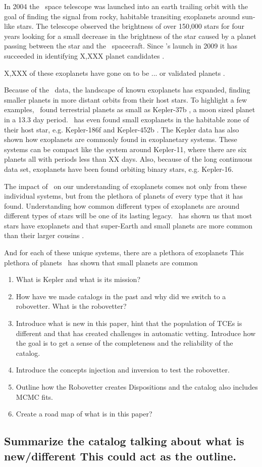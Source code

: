 In 2004 the \Kepler\ space telescope was launched into an earth trailing orbit with the goal of finding the signal from rocky, habitable transiting exoplanets \citep{Koch2010} around sun-like stars. The telescope observed the brightness of over 150,000 stars for four years looking for a small decrease in the brightness of the star caused by a planet passing between the star and the \Kepler\ spacecraft. 
Since \Kepler's launch in 2009 it has succeeded in identifying X,XXX planet candidates \citep{Borucki2010a,Coughlin2016}. 

X,XXX of these exoplanets have gone on to be ... or validated planets \citep[see most recently][]{Morton2016}.  %

Because of the \Kepler\ data, the landscape of known exoplanets has expanded, finding smaller planets in more distant orbits from their host stars.  To highlight a few examples,  \Kepler\ found terrestrial planets as small as Kepler-37b \citep{Barclay2013}, a moon sized planet in a 13.3 day period. \Kepler\ has even found small exoplanets in the habitable zone of their host star, e.g. Kepler-186f \citep{Quintana2014} and Kepler-452b \citep{Jenkins2015}.  The Kepler data has also shown how exoplanets are commonly found in exoplanetary systems. These systems can be compact like the system around Kepler-11, where there are six planets all with periods less than XX days. Also, because of the long continuous data set, exoplanets have been found orbiting binary stars, e.g. Kepler-16\citep{Doyle2011}.


The impact of \Kepler\ on our understanding of exoplanets comes not only from these individual systems, but from the plethora of planets of every type that it has found. Understanding how common different types of exoplanets are around different types of stars will be one of its lasting legacy. \Kepler\ has shown us that most stars have exoplanets and that super-Earth and small planets are more common than their larger cousins \citet{Burke2015}.  


And for each of these unique systems, there are a plethora of exoplanets This plethora of planets \Kepler\ has shown that small planets are common 

\begin{enumerate}
\item What is Kepler and what is its mission?
\item How have we made catalogs in the past and why did we switch to a robovetter. What is the robovetter?
\item Introduce what is new in this paper, hint that the population of TCEs is different and that has created challenges in automatic vetting. Introduce how the goal is to get a sense of the completeness and the reliability of the catalog.
\item Introduce the concepts injection and inversion to test the robovetter.
\item Outline how the Robovetter creates Dispositions and the catalog also includes MCMC fits.
\item Create a road map of what is in this paper?
\end{enumerate}

\subsection{Summarize the catalog talking about what is new/different This could act as the outline.}
